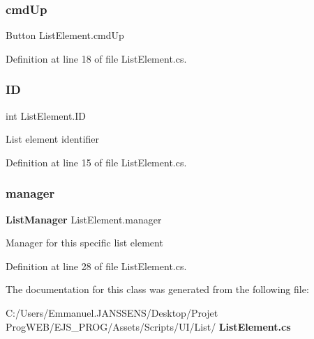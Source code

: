 \subsubsection{cmd\+Up}
{\footnotesize\ttfamily Button List\+Element.\+cmd\+Up}



Definition at line 18 of file List\+Element.\+cs.

\mbox{\label{class_list_element_aa36fdc6cf3357f615db584ef6acda102}} 
\subsubsection{ID}
{\footnotesize\ttfamily int List\+Element.\+ID}



List element identifier 



Definition at line 15 of file List\+Element.\+cs.

\mbox{\label{class_list_element_af836b5f97d03c8b2445822dc89443cb6}} 
\subsubsection{manager}
{\footnotesize\ttfamily \textbf{ List\+Manager} List\+Element.\+manager}



Manager for this specific list element 



Definition at line 28 of file List\+Element.\+cs.



The documentation for this class was generated from the following file\+:\begin{DoxyCompactItemize}
\item 
C\+:/\+Users/\+Emmanuel.\+J\+A\+N\+S\+S\+E\+N\+S/\+Desktop/\+Projet Prog\+W\+E\+B/\+E\+J\+S\+\_\+\+P\+R\+O\+G/\+Assets/\+Scripts/\+U\+I/\+List/\textbf{ List\+Element.\+cs}\end{DoxyCompactItemize}
